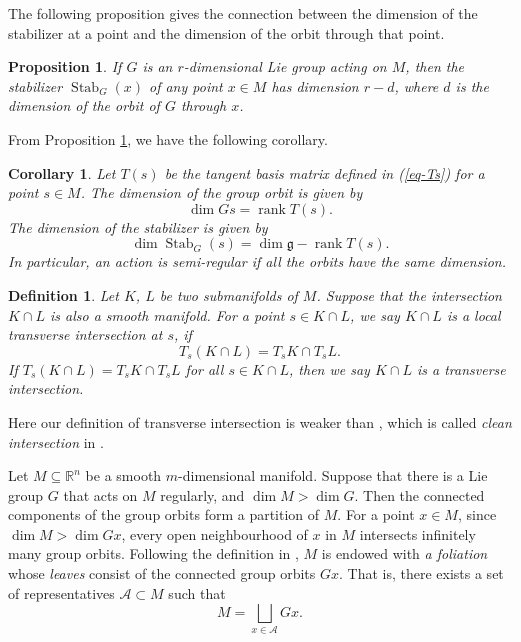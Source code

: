 \documentclass[10pt,a4paper]{amsart}
\newtheorem{corollary}[theorem]{Corollary}
\newtheorem{proposition}[theorem]{Proposition}
\newtheorem{definition}[theorem]{Definition}
\numberwithin{equation}{section}
\begin{document}
The following proposition gives the connection between the dimension of the stabilizer at a point and the dimension of the orbit through that point.
\begin{proposition}\cite[Prop.2.67]{olver95e}\label{prop-dimstab}
If $G$ is an $r$-dimensional Lie group acting on $M$, then the stabilizer $\operatorname{Stab}_G(x)$ of any point $x \in M$ has dimension $r-d$, where $d$ is the dimension of the orbit of $G$ through $x$.
\end{proposition}

From Proposition \ref{prop-dimstab}, we have the following corollary.
\begin{corollary}\label{cor-dimos}
Let $T(s)$ be the tangent basis matrix defined in (\ref{eq-Ts}) for a point $s\in M$. The dimension of the group orbit is given by 
$$\dim Gs= \operatorname{rank}T(s).$$
The dimension of the stabilizer is given by
$$\dim \operatorname{Stab}_G(s)=\dim \mathfrak{g}-\operatorname{rank}T(s).$$
In particular, an action is semi-regular if all the orbits have the same dimension.
\end{corollary}

\begin{definition}\label{def-tranint}
Let $K$, $L$ be two submanifolds of $M$. Suppose that the intersection $K\cap L$ is also a smooth manifold. For a point $s\in K\cap L$, we say $K\cap L$ is \emph{a local transverse intersection at} $s$, if
 $$T_s (K\cap L)=T_s K\cap T_s L.$$
If $T_s (K\cap L)=T_s K\cap T_s L$ for all $s\in K\cap L$, then we say $K\cap L$ is \emph{a transverse intersection}. 
\end{definition}
Here our definition of transverse intersection is weaker than \cite{lee12smooth}, which is called \emph{clean intersection} in \cite[Append. C.3]{Hor85III}.

Let $M\subseteq \mathbb{R}^n$ be a smooth $m$-dimensional manifold. Suppose that there is a Lie group $G$ that acts on $M$ regularly, and $\dim M>\dim G$. Then the connected components of the group orbits form a
partition of $M$. For a point $x\in M$, since $\dim M>\dim Gx$, every open neighbourhood of $x$ in $M$ intersects infinitely many group orbits.
Following the definition in \cite{lawson74fol,lee12smooth}, $M$ is endowed with \emph{a foliation}  whose \emph{leaves} consist of the connected group orbits $Gx$. That is, there exists a set of representatives $\mathcal{A}\subset M$ such that
\begin{equation*}
M=\bigsqcup_{x\in \mathcal{A}} Gx.
\end{equation*}
\end{document}
